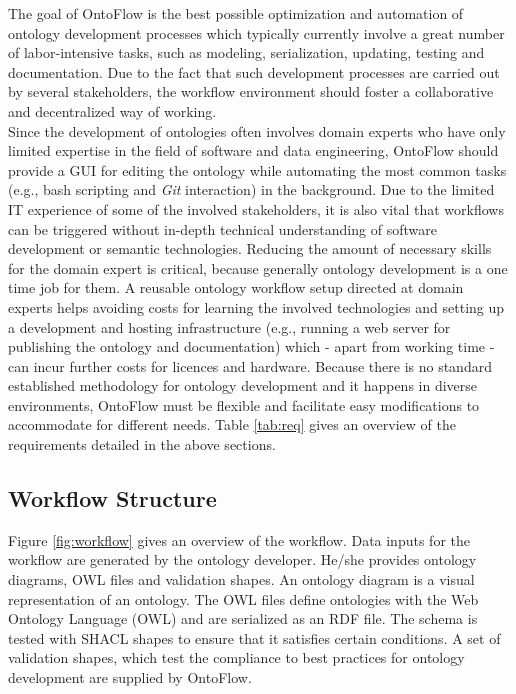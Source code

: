 \documentclass[runningheads]{llncs}
\begin{document}
The goal of OntoFlow is the best possible optimization and automation of ontology development processes which typically currently involve a great number of labor-intensive tasks, such as modeling, serialization, updating, testing and documentation. Due to the fact that such development processes are carried out by several stakeholders, the workflow environment should foster a collaborative and decentralized way of working.\\
Since the development of ontologies often involves domain experts who have only limited expertise in the field of software and data engineering, OntoFlow should provide a GUI for editing the ontology while automating the most common tasks (e.g., bash scripting and \textit{Git} interaction) in the background. Due to the limited IT experience of some of the involved stakeholders, it is also vital that workflows can be triggered without in-depth technical understanding of software development or semantic technologies. Reducing the amount of necessary skills for the domain expert is critical, because generally ontology development is a one time job for them. A reusable ontology workflow setup directed at domain experts helps avoiding costs for learning the involved technologies and setting up a development and hosting infrastructure (e.g., running a web server for publishing the ontology and documentation) which - apart from working time - can incur further costs for licences and hardware. Because there is no standard established methodology for ontology development and it happens in diverse environments, OntoFlow must be flexible and facilitate easy modifications to accommodate for different needs. Table \ref{tab:req} gives an overview of the requirements detailed in the above sections.

\subsection{Workflow Structure}
Figure \ref{fig:workflow} gives an overview of the workflow. Data inputs for the workflow are generated by the ontology developer. He/she provides ontology diagrams, OWL files and validation shapes. An ontology diagram is a visual representation of an ontology. The OWL files define ontologies with the Web Ontology Language (OWL) and are serialized as an RDF file. The schema is tested with SHACL shapes to ensure that it satisfies certain conditions. A set of validation shapes, which test the compliance to best practices for ontology development are supplied by OntoFlow.
\end{document}
